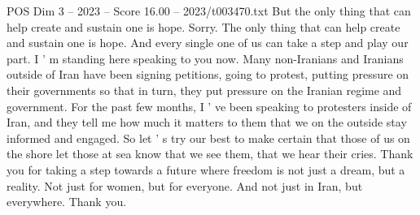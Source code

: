 \begin{textsample}{POS Dim 3 – 2023 – Score 16.00 – 2023/t003470.txt}
But the only thing that can help create and sustain one is hope.
Sorry.
The only thing that can help create and sustain one is hope.
And every single one of us can take a step and play our part.
I ' m standing here speaking to you now.
Many non-Iranians and Iranians outside of Iran have been signing petitions, going to protest, putting pressure on their governments so that in turn, they put pressure on the Iranian regime and government.
For the past few months, I ' ve been speaking to protesters inside of Iran, and they tell me how much it matters to them that we on the outside stay informed and engaged.
So let ' s try our best to make certain that those of us on the shore let those at sea know that we see them, that we hear their cries.
Thank you for taking a step towards a future where freedom is not just a dream, but a reality.
Not just for women, but for everyone.
And not just in Iran, but everywhere.
Thank you.

\end{textsample}
